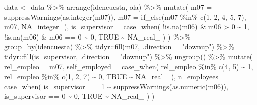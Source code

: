 \documentclass[
  spanish,
  a4paper,
  oneside]{scrbook}
\newenvironment{Shaded}{\begin{snugshade}}{\end{snugshade}}
\newcommand{\AttributeTok}[1]{\textcolor[rgb]{0.40,0.45,0.13}{#1}}
\newcommand{\ConstantTok}[1]{\textcolor[rgb]{0.56,0.35,0.01}{#1}}
\newcommand{\DecValTok}[1]{\textcolor[rgb]{0.68,0.00,0.00}{#1}}
\newcommand{\FunctionTok}[1]{\textcolor[rgb]{0.28,0.35,0.67}{#1}}
\newcommand{\NormalTok}[1]{\textcolor[rgb]{0.00,0.23,0.31}{#1}}
\newcommand{\OtherTok}[1]{\textcolor[rgb]{0.00,0.23,0.31}{#1}}
\newcommand{\SpecialCharTok}[1]{\textcolor[rgb]{0.37,0.37,0.37}{#1}}
\newcommand{\StringTok}[1]{\textcolor[rgb]{0.13,0.47,0.30}{#1}}
\begin{document}
\begin{Shaded}
\begin{Highlighting}[]
\NormalTok{  data }\OtherTok{\textless{}{-}}\NormalTok{ data }\SpecialCharTok{\%\textgreater{}\%}
    \FunctionTok{arrange}\NormalTok{(idencuesta, ola) }\SpecialCharTok{\%\textgreater{}\%}
    \FunctionTok{mutate}\NormalTok{(}
      \AttributeTok{m07 =} \FunctionTok{suppressWarnings}\NormalTok{(}\FunctionTok{as.integer}\NormalTok{(m07)),}
      \AttributeTok{m07 =} \FunctionTok{if\_else}\NormalTok{(m07 }\SpecialCharTok{\%in\%} \FunctionTok{c}\NormalTok{(}\DecValTok{1}\NormalTok{, }\DecValTok{2}\NormalTok{, }\DecValTok{4}\NormalTok{, }\DecValTok{5}\NormalTok{, }\DecValTok{7}\NormalTok{), m07, }\ConstantTok{NA\_integer\_}\NormalTok{),}
      \AttributeTok{is\_supervisor =} \FunctionTok{case\_when}\NormalTok{(}
        \SpecialCharTok{!}\FunctionTok{is.na}\NormalTok{(m06) }\SpecialCharTok{\&}\NormalTok{ m06 }\SpecialCharTok{\textgreater{}} \DecValTok{0} \SpecialCharTok{\textasciitilde{}} \DecValTok{1}\NormalTok{,}
        \SpecialCharTok{!}\FunctionTok{is.na}\NormalTok{(m06) }\SpecialCharTok{\&}\NormalTok{ m06 }\SpecialCharTok{==} \DecValTok{0} \SpecialCharTok{\textasciitilde{}} \DecValTok{0}\NormalTok{,}
        \ConstantTok{TRUE} \SpecialCharTok{\textasciitilde{}} \ConstantTok{NA\_real\_}
\NormalTok{      )}
\NormalTok{    ) }\SpecialCharTok{\%\textgreater{}\%}
    \FunctionTok{group\_by}\NormalTok{(idencuesta) }\SpecialCharTok{\%\textgreater{}\%}
\NormalTok{    tidyr}\SpecialCharTok{::}\FunctionTok{fill}\NormalTok{(m07, }\AttributeTok{.direction =} \StringTok{"downup"}\NormalTok{) }\SpecialCharTok{\%\textgreater{}\%}
\NormalTok{    tidyr}\SpecialCharTok{::}\FunctionTok{fill}\NormalTok{(is\_supervisor, }\AttributeTok{.direction =} \StringTok{"downup"}\NormalTok{) }\SpecialCharTok{\%\textgreater{}\%}
    \FunctionTok{ungroup}\NormalTok{() }\SpecialCharTok{\%\textgreater{}\%}
    \FunctionTok{mutate}\NormalTok{(}
      \AttributeTok{rel\_empleo =}\NormalTok{ m07,}
      \AttributeTok{self\_employed =} \FunctionTok{case\_when}\NormalTok{(}
\NormalTok{        rel\_empleo }\SpecialCharTok{\%in\%} \FunctionTok{c}\NormalTok{(}\DecValTok{4}\NormalTok{, }\DecValTok{5}\NormalTok{) }\SpecialCharTok{\textasciitilde{}} \DecValTok{1}\NormalTok{,}
\NormalTok{        rel\_empleo }\SpecialCharTok{\%in\%} \FunctionTok{c}\NormalTok{(}\DecValTok{1}\NormalTok{, }\DecValTok{2}\NormalTok{, }\DecValTok{7}\NormalTok{) }\SpecialCharTok{\textasciitilde{}} \DecValTok{0}\NormalTok{,}
        \ConstantTok{TRUE} \SpecialCharTok{\textasciitilde{}} \ConstantTok{NA\_real\_}
\NormalTok{      ),}
      \AttributeTok{n\_employees =} \FunctionTok{case\_when}\NormalTok{(}
\NormalTok{        is\_supervisor }\SpecialCharTok{==} \DecValTok{1} \SpecialCharTok{\textasciitilde{}} \FunctionTok{suppressWarnings}\NormalTok{(}\FunctionTok{as.numeric}\NormalTok{(m06)),}
\NormalTok{        is\_supervisor }\SpecialCharTok{==} \DecValTok{0} \SpecialCharTok{\textasciitilde{}} \DecValTok{0}\NormalTok{,}
        \ConstantTok{TRUE} \SpecialCharTok{\textasciitilde{}} \ConstantTok{NA\_real\_}
\NormalTok{      )}
\NormalTok{    )}


\end{Highlighting}
\end{Shaded}
\end{document}
